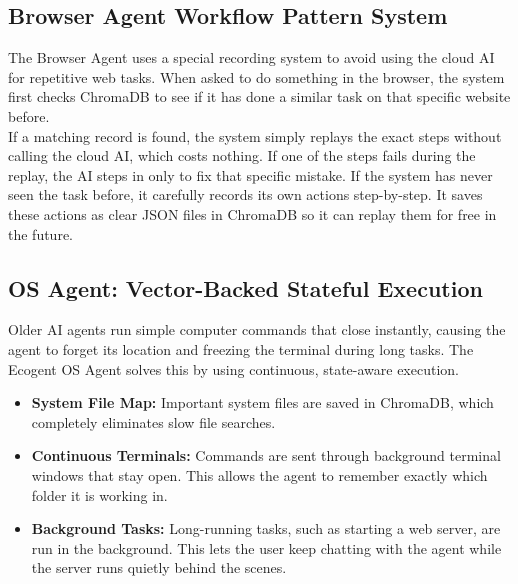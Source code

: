 \subsection{Browser Agent Workflow Pattern System}
The Browser Agent uses a special recording system to avoid using the cloud AI for repetitive web tasks. When asked to do something in the browser, the system first checks ChromaDB to see if it has done a similar task on that specific website before.\\

If a matching record is found, the system simply replays the exact steps without calling the cloud AI, which costs nothing. If one of the steps fails during the replay, the AI steps in only to fix that specific mistake. If the system has never seen the task before, it carefully records its own actions step-by-step. It saves these actions as clear JSON files in ChromaDB so it can replay them for free in the future.\\

\subsection{OS Agent: Vector-Backed Stateful Execution}
Older AI agents run simple computer commands that close instantly, causing the agent to forget its location and freezing the terminal during long tasks. The Ecogent OS Agent solves this by using continuous, state-aware execution. 
\begin{itemize}
    \item \textbf{System File Map:} Important system files are saved in ChromaDB, which completely eliminates slow file searches.
    \item \textbf{Continuous Terminals:} Commands are sent through background terminal windows that stay open. This allows the agent to remember exactly which folder it is working in.
    \item \textbf{Background Tasks:} Long-running tasks, such as starting a web server, are run in the background. This lets the user keep chatting with the agent while the server runs quietly behind the scenes.
\end{itemize}

